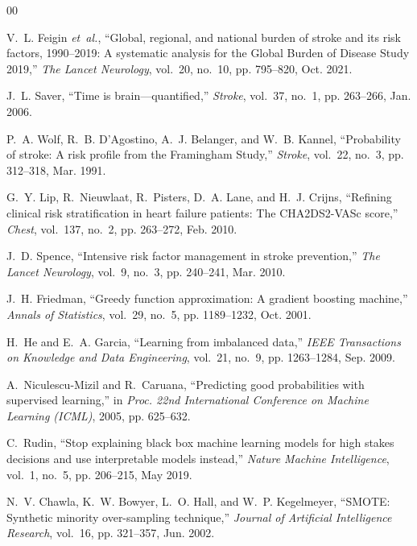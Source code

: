 \documentclass[conference]{IEEEtran}
\begin{document}
\begin{thebibliography}{00}

V.~L. Feigin \emph{et~al.}, ``Global, regional, and national burden of stroke and its risk factors, 1990--2019: A systematic analysis for the Global Burden of Disease Study 2019,'' \emph{The Lancet Neurology}, vol.~20, no.~10, pp. 795--820, Oct. 2021.

J.~L. Saver, ``Time is brain---quantified,'' \emph{Stroke}, vol.~37, no.~1, pp. 263--266, Jan. 2006.

P.~A. Wolf, R.~B. D'Agostino, A.~J. Belanger, and W.~B. Kannel, ``Probability of stroke: A risk profile from the Framingham Study,'' \emph{Stroke}, vol.~22, no.~3, pp. 312--318, Mar. 1991.

G.~Y. Lip, R.~Nieuwlaat, R.~Pisters, D.~A. Lane, and H.~J. Crijns, ``Refining clinical risk stratification in heart failure patients: The CHA2DS2-VASc score,'' \emph{Chest}, vol.~137, no.~2, pp. 263--272, Feb. 2010.

J.~D. Spence, ``Intensive risk factor management in stroke prevention,'' \emph{The Lancet Neurology}, vol.~9, no.~3, pp. 240--241, Mar. 2010.

J.~H. Friedman, ``Greedy function approximation: A gradient boosting machine,'' \emph{Annals of Statistics}, vol.~29, no.~5, pp. 1189--1232, Oct. 2001.

H.~He and E.~A. Garcia, ``Learning from imbalanced data,'' \emph{IEEE Transactions on Knowledge and Data Engineering}, vol.~21, no.~9, pp. 1263--1284, Sep. 2009.

A.~Niculescu-Mizil and R.~Caruana, ``Predicting good probabilities with supervised learning,'' in \emph{Proc. 22nd International Conference on Machine Learning (ICML)}, 2005, pp. 625--632.

C.~Rudin, ``Stop explaining black box machine learning models for high stakes decisions and use interpretable models instead,'' \emph{Nature Machine Intelligence}, vol.~1, no.~5, pp. 206--215, May 2019.

N.~V. Chawla, K.~W. Bowyer, L.~O. Hall, and W.~P. Kegelmeyer, ``SMOTE: Synthetic minority over-sampling technique,'' \emph{Journal of Artificial Intelligence Research}, vol.~16, pp. 321--357, Jun. 2002.


\end{thebibliography}
\end{document}
